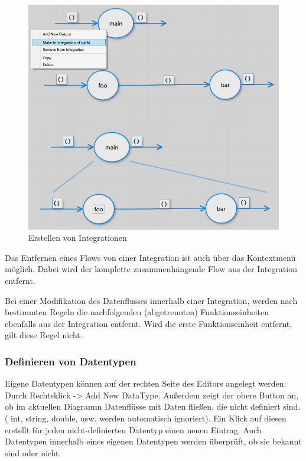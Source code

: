 		\begin{figure}[H]
			\centering
			\includegraphics[width=1\linewidth]{./img/pickIntegration.jpg} 
			\caption{Erstellen von Integrationen}
		\end{figure}
		
	
	
	Das Entfernen eines Flows von einer Integration ist auch über das Kontextmenü
  möglich.
  Dabei wird der komplette zusammenhängende Flow aus der
	Integration entfernt. 
	
	
	Bei einer Modifikation des Datenflusses innerhalb einer Integration, werden nach
	bestimmten Regeln die nachfolgenden (abgetrennten) Funktionseinheiten
	ebenfalls aus der Integration entfernt. Wird die erste Funktionseinheit
	entfernt, gilt diese Regel nicht.
	
	\subsubsection{Definieren von Datentypen}

	Eigene Datentypen können auf der rechten Seite des Editors angelegt werden.
	Durch Rechtsklick -> Add New DataType. Außerdem zeigt der obere Button an,
	ob im aktuellen Diagramm Datenflüsse mit Daten fließen, die nicht definiert
	sind. ( int, string, double, usw. werden automatisch ignoriert). Ein Klick
	auf diesen erstellt für jeden nicht-definierten Datentyp einen neuen Eintrag.
	Auch Datentypen innerhalb eines eigenen Datentypen werden überprüft, ob sie 
	bekannt sind oder nicht.
	
